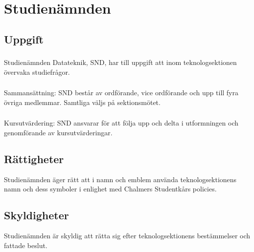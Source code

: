 \section{Studienämnden}
\subsection{Uppgift}
\subsubsection{}
Studienämnden Datateknik, SND, har till uppgift att inom teknologsektionen övervaka studiefrågor.
\subsubsection{}
Sammansättning: SND består av ordförande, vice ordförande och upp till fyra övriga medlemmar. Samtliga väljs på sektionsmötet.
\subsubsection{}
Kursutvärdering: SND ansvarar för att följa upp och delta i utformningen och genomförande av kursutvärderingar.
\subsection{Rättigheter}
Studienämnden äger rätt att i namn och emblem använda teknologsektionens namn och dess symboler i enlighet med Chalmers Studentkårs policies.
\subsection{Skyldigheter}
Studienämnden är skyldig att rätta sig efter teknologsektionens bestämmelser och fattade beslut.
